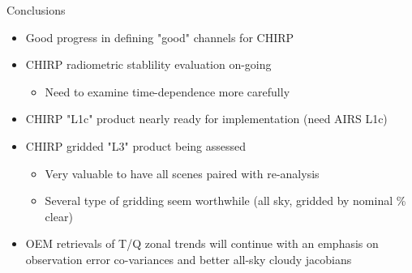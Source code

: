 \documentclass[10pt,t]{beamer}
\begin{document}
\begin{frame}[label={sec:orgd69b81c}]{Conclusions}
\begin{itemize}
\item Good progress in defining "good" channels for CHIRP
\item CHIRP radiometric stablility evaluation on-going
\begin{itemize}
\item Need to examine time-dependence more carefully
\end{itemize}
\item CHIRP "L1c" product nearly ready for implementation (need AIRS L1c)
\item CHIRP gridded "L3" product being assessed
\begin{itemize}
\item Very valuable to have all scenes paired with re-analysis
\item Several type of gridding seem worthwhile (all sky, gridded by nominal \% clear)
\end{itemize}
\item OEM retrievals of T/Q zonal trends will continue with an emphasis on observation error co-variances and better all-sky cloudy jacobians
\end{itemize}
\end{frame}
\end{document}
